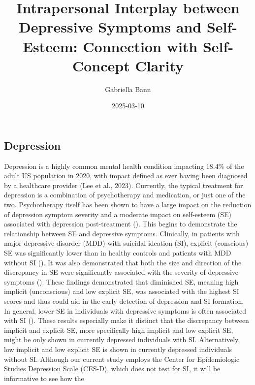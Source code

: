 \documentclass[
  man,
  longtable,
  nolmodern,
  notxfonts,
  notimes,
  colorlinks=true,linkcolor=blue,citecolor=blue,urlcolor=blue]{apa7}
\title{Intrapersonal Interplay between Depressive Symptoms and
Self-Esteem: Connection with Self-Concept Clarity}
\author{Gabriella Bann}
\affiliation{
{University of Chicago}}
\date{2025-03-10}
\begin{document}
\maketitle


\setcounter{secnumdepth}{-\maxdimen} %

\setlength\LTleft{0pt}


\subsection{Depression}\label{depression}

Depression is a highly common mental health condition impacting 18.4\%
of the adult US population in 2020, with impact defined as ever having
been diagnosed by a healthcare provider (Lee et al., 2023). Currently,
the typical treatment for depression is a combination of psychotherapy
and medication, or just one of the two. Psychotherapy itself has been
shown to have a large impact on the reduction of depression symptom
severity and a moderate impact on self-esteem (SE) associated with
depression post-treatment
().
This begins to demonstrate the relationship between SE and depressive
symptoms. Clinically, in patients with major depressive disorder (MDD)
with suicidal ideation (SI), explicit (conscious) SE was significantly
lower than in healthy controls and patients with MDD without SI
(). It was also
demonstrated that both the size and direction of the discrepancy in SE
were significantly associated with the severity of depressive symptoms
(). These findings
demonstrated that diminished SE, meaning high implicit (unconscious) and
low explicit SE, was associated with the highest SI scores and thus
could aid in the early detection of depression and SI formation. In
general, lower SE in individuals with depressive symptoms is often
associated with SI (). These results especially make it distinct that the discrepancy
between implicit and explicit SE, more specifically high implicit and
low explicit SE, might be only shown in currently depressed individuals
with SI. Alternatively, low implicit and low explicit SE is shown in
currently depressed individuals without SI. Although our current study
employs the Center for Epidemiologic Studies Depression Scale (CES-D),
which does not test for SI, it will be informative to see how the
\end{document}
